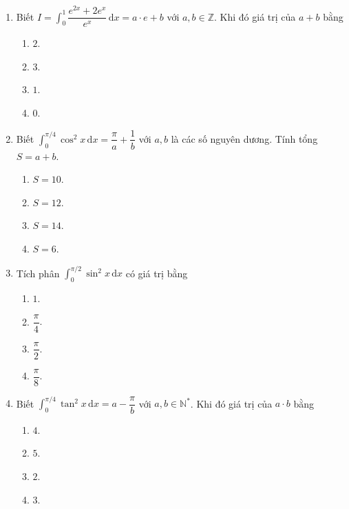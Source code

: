\documentclass[12pt]{article}
\begin{document}
\begin{enumerate}[label=\textbf{Câu \arabic*.}]
		\item Biết $I = \displaystyle \int_0^1 \dfrac{e^{2x} + 2e^x}{e^x}\,\mathrm{d}x = a\cdot e + b$ với $a, b \in \mathbb{Z}$. Khi đó giá trị của $a + b$ bằng
		\begin{multicols}{4}
			\begin{enumerate}[label=\textbf{\Alph*.}]
				\item $2$.
				\item $3$.
				\item $1$.
				\item $0$.
			\end{enumerate}
		\end{multicols}
		
		\item Biết $\displaystyle \int_0^{\pi/4} \cos^2 x\,\mathrm{d}x = \dfrac{\pi}{a} + \dfrac{1}{b}$ với $a, b$ là các số nguyên dương. Tính tổng $S = a + b$.
		\begin{multicols}{4}
			\begin{enumerate}[label=\textbf{\Alph*.}]
				\item $S = 10$.
				\item $S = 12$.
				\item $S = 14$.
				\item $S = 6$.
			\end{enumerate}
		\end{multicols}
		
		\item Tích phân $\displaystyle \int_0^{\pi/2} \sin^2 x\,\mathrm{d}x$ có giá trị bằng
		\begin{multicols}{4}
			\begin{enumerate}[label=\textbf{\Alph*.}]
				\item $1$.
				\item $\dfrac{\pi}{4}$.
				\item $\dfrac{\pi}{2}$.
				\item $\dfrac{\pi}{8}$.
			\end{enumerate}
		\end{multicols}
		
		\item Biết $\displaystyle \int_0^{\pi/4} \tan^2 x\,\mathrm{d}x = a - \dfrac{\pi}{b}$ với $a, b \in \mathbb{N}^*$. Khi đó giá trị của $a \cdot b$ bằng
		\begin{multicols}{4}
			\begin{enumerate}[label=\textbf{\Alph*.}]
				\item $4$.
				\item $5$.
				\item $2$.
				\item $3$.
			\end{enumerate}
		\end{multicols}
	

\end{enumerate}
\end{document}
